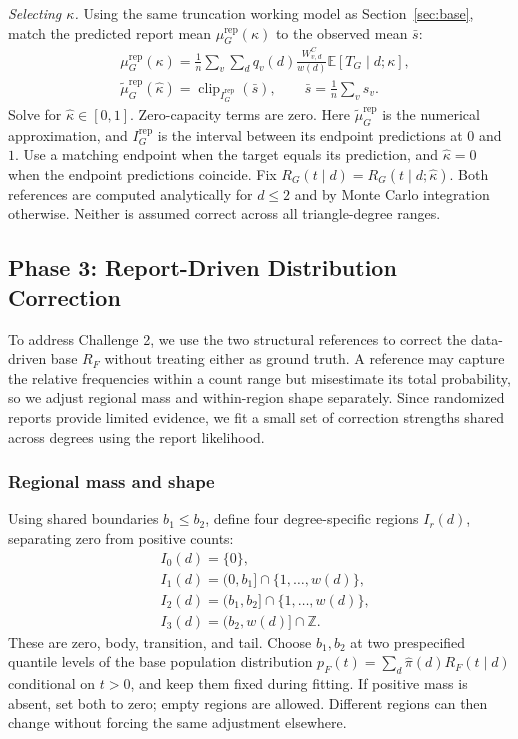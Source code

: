 \emph{Selecting $\kappa$.} Using the same truncation working model as Section~\ref{sec:base}, match the predicted report mean $\mu_G^{\mathrm{rep}}(\kappa)$ to the observed mean $\bar s$:
\begin{equation}
\begin{aligned}
&\mu_G^{\mathrm{rep}}(\kappa)=\frac1n\sum_v\sum_d
q_v(d)\frac{W^C_{v,d}}{w(d)}\mathbb E[T_G\mid d;\kappa],\\
&\widetilde\mu_G^{\mathrm{rep}}(\widehat\kappa)
=\operatorname{clip}_{I_G^{\mathrm{rep}}}(\bar s),
\qquad \bar s=\frac1n\sum_vs_v.
\end{aligned}
\label{eq:geometry_calibration}
\end{equation}
Solve for $\widehat\kappa\in[0,1]$. Zero-capacity terms are zero. Here $\widetilde\mu_G^{\mathrm{rep}}$ is the numerical approximation, and $I_G^{\mathrm{rep}}$ is the interval between its endpoint predictions at $0$ and $1$. Use a matching endpoint when the target equals its prediction, and $\widehat\kappa=0$ when the endpoint predictions coincide. Fix $R_G(t\mid d)=R_G(t\mid d;\widehat\kappa)$. Both references are computed analytically for $d\le2$ and by Monte Carlo integration otherwise. Neither is assumed correct across all triangle-degree ranges.


\subsection{Phase 3: Report-Driven Distribution Correction}
\label{sec:correction}
To address Challenge 2, we use the two structural references
to correct the data-driven base $R_F$ without treating
either as ground truth.
A reference may capture the relative frequencies within
a count range but misestimate its total probability,
so we adjust regional mass and within-region shape separately.
Since randomized reports provide limited evidence,
we fit a small set of correction strengths shared across
degrees using the report likelihood.

\subsubsection{Regional mass and shape}
Using shared boundaries $b_1\le b_2$, define four degree-specific regions $I_r(d)$, separating zero from positive counts:
\begin{equation}
\begin{aligned}
&I_0(d)=\{0\},\\
&I_1(d)=(0,b_1]\cap\{1,\ldots,w(d)\},\\
&I_2(d)=(b_1,b_2]\cap\{1,\ldots,w(d)\},\\
&I_3(d)=(b_2,w(d)]\cap\mathbb Z.
\end{aligned}
\label{eq:participation_regions}
\end{equation}
These are zero, body, transition, and tail. Choose $b_1,b_2$ at two prespecified quantile levels of the base population distribution $p_F(t)=\sum_d\widehat\pi(d)R_F(t\mid d)$ conditional on $t>0$, and keep them fixed during fitting. If positive mass is absent, set both to zero; empty regions are allowed. Different regions can then change without forcing the same adjustment elsewhere.

